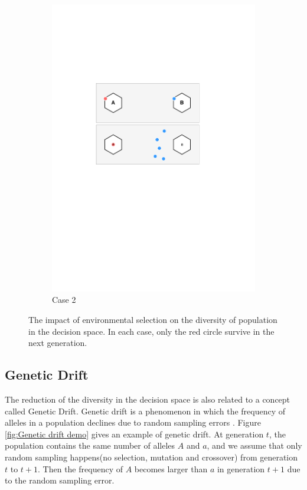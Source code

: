 \documentclass[conference]{IEEEtran}
\begin{document}
\begin{figure}[htbp]
\begin{subfigure}[b]{.3\textwidth}
		\includegraphics[width=\linewidth]{Section3/case2}
		\caption{Case 2}
	\end{subfigure}
	\caption{The impact of environmental selection on the diversity of population in the decision space. In each case, only the red circle survive in the next generation.}
	\label{fig: Environmental selection}
\end{figure}


\subsection{Genetic Drift}
The reduction of the diversity in the decision space is also related to a concept called Genetic Drift. Genetic drift is a phenomenon in which the frequency of alleles in a population declines due to random sampling errors \cite{GeneticDrift}. Figure  \ref{fig:Genetic drift demo} gives an example of genetic drift. At generation $t$, the population contains the same number of alleles $A$ and $a$, and we assume that only random sampling happens(no selection, mutation and crossover) from generation $t$ to $t+1$. Then the frequency of $A$ becomes larger than $a$ in generation $t+1$ due to the random sampling error. 
\end{document}
